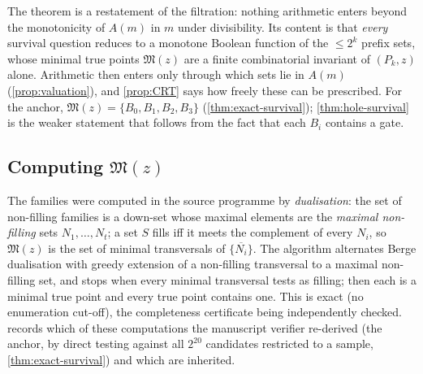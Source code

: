 \begin{remark}
The theorem is a restatement of the filtration: nothing arithmetic enters beyond the monotonicity of $A(m)$ in $m$ under divisibility. Its content is that \emph{every} survival question reduces to a monotone Boolean function of the $\le 2^k$ prefix sets, whose minimal true points $\mathfrak M(z)$ are a finite combinatorial invariant of $(P_k,z)$ alone. Arithmetic then enters only through which sets lie in $A(m)$ (\cref{prop:valuation}), and \cref{prop:CRT} says how freely these can be prescribed. For the anchor, $\mathfrak M(z)=\{B_0,B_1,B_2,B_3\}$ (\cref{thm:exact-survival}); \cref{thm:hole-survival} is the weaker statement that follows from the fact that each $B_i$ contains a gate.
\end{remark}

\subsection{Computing \texorpdfstring{$\mathfrak M(z)$}{M(z)}}
The families were computed in the source programme by \emph{dualisation}: the set of non-filling families is a down-set whose maximal elements are the \emph{maximal non-filling} sets $N_1,\dots,N_t$; a set $S$ fills iff it meets the complement of every $N_i$, so $\mathfrak M(z)$ is the set of minimal transversals of $\{\overline{N_i}\}$. The algorithm alternates Berge dualisation with greedy extension of a non-filling transversal to a maximal non-filling set, and stops when every minimal transversal tests as filling; then each is a minimal true point and every true point contains one. This is exact (no enumeration cut-off), the completeness certificate being independently checked.  records which of these computations the manuscript verifier re-derived (the anchor, by direct testing against all $2^{20}$ candidates restricted to a sample, \cref{thm:exact-survival}) and which are inherited.

